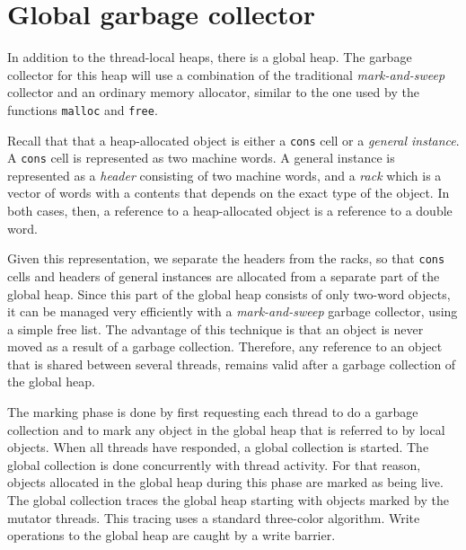 \section{Global garbage collector}

In addition to the thread-local heaps, there is a global heap.  The
garbage collector for this heap will use a combination of the
traditional \emph{mark-and-sweep} collector and an ordinary memory
allocator, similar to the one used by the \clanguage{} functions
\texttt{malloc} and \texttt{free}.

Recall that that a heap-allocated object is either a \texttt{cons}
cell or a \emph{general instance}.  A \texttt{cons} cell is
represented as two machine words.  A general instance is represented
as a \emph{header} consisting of two machine words, and a \emph{rack}
which is a vector of words with a contents that depends on the exact
type of the object.  In both cases, then, a reference to a
heap-allocated object is a reference to a double word.

Given this representation, we separate the headers from the racks, so
that \texttt{cons} cells and headers of general instances are
allocated from a separate part of the global heap.  Since this part of
the global heap consists of only two-word objects, it can be managed
very efficiently with a \emph{mark-and-sweep} garbage collector, using
a simple free list.  The advantage of this technique is that an object
is never moved as a result of a garbage collection.  Therefore, any
reference to an object that is shared between several threads, remains
valid after a garbage collection of the global heap.

The marking phase is done by first requesting each thread to do a
garbage collection and to mark any object in the global heap that is
referred to by local objects.  When all threads have responded, a
global collection is started.  The global collection is done
concurrently with thread activity.  For that reason, objects allocated
in the global heap during this phase are marked as being live.
The global collection traces the global heap starting with objects
marked by the mutator threads.  This tracing uses a standard
three-color algorithm.  Write operations to the global heap are caught
by a write barrier.
